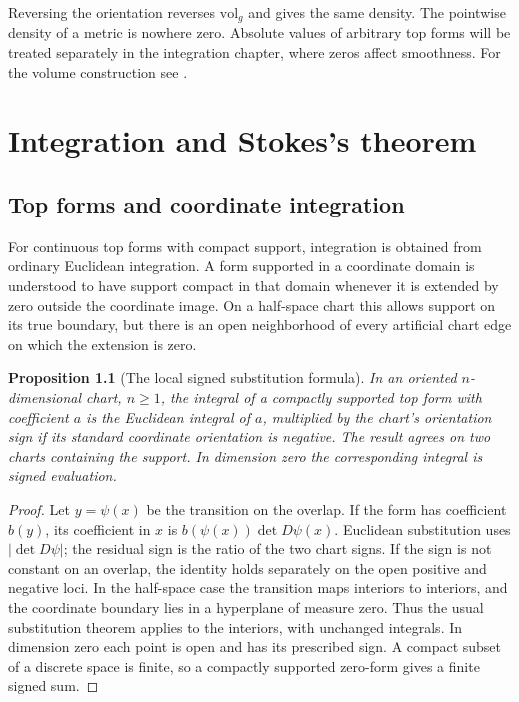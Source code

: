 \documentclass[11pt,oneside,openany]{book}
\newtheorem{proposition}[theorem]{Proposition}
\theoremstyle{definition}
\theoremstyle{remark}
\begin{document}
Reversing the orientation reverses \(\mathrm{vol}_g\) and gives the same density. The pointwise density of a metric is nowhere zero. Absolute values of arbitrary top forms will be treated separately in the integration chapter, where zeros affect smoothness. For the volume construction see \cite[Proposition 15.29 and pp.~427--432]{lee}.
\chapter{Integration and Stokes's theorem}

\section{Top forms and coordinate integration}

For continuous top forms with compact support, integration is obtained from
ordinary Euclidean integration. A form supported in a coordinate domain is
understood to have support compact in that domain whenever it is extended by
zero outside the coordinate image. On a half-space chart this allows support
on its true boundary, but there is an open neighborhood of every artificial
chart edge on which the extension is zero.

\begin{proposition}[The local signed substitution formula]
\label{p104:M10.01}
In an oriented \(n\)-dimensional chart, \(n\geq1\), the integral of a
compactly supported top form with coefficient \(a\) is the Euclidean
integral of \(a\), multiplied by the chart's orientation sign if its
standard coordinate orientation is negative. The result agrees on two
charts containing the support. In dimension zero the corresponding
integral is signed evaluation.
\end{proposition}
\begin{proof}
Let \(y=\psi(x)\) be the transition on the overlap. If the form has
coefficient \(b(y)\), its coefficient in \(x\) is
\(b(\psi(x))\det D\psi(x)\). Euclidean substitution uses
\(\lvert\det D\psi\rvert\); the residual sign is the ratio of the two
chart signs. If the sign is not constant on an overlap, the identity
holds separately on the open positive and negative loci. In the
half-space case the transition maps interiors to interiors, and the
coordinate boundary lies in a hyperplane of measure zero. Thus the
usual substitution theorem applies to the interiors, with unchanged
integrals. In dimension zero each point is open and has its prescribed
sign. A compact subset of a discrete space is finite, so a
compactly supported zero-form gives a finite signed sum.
\end{proof}
\end{document}
